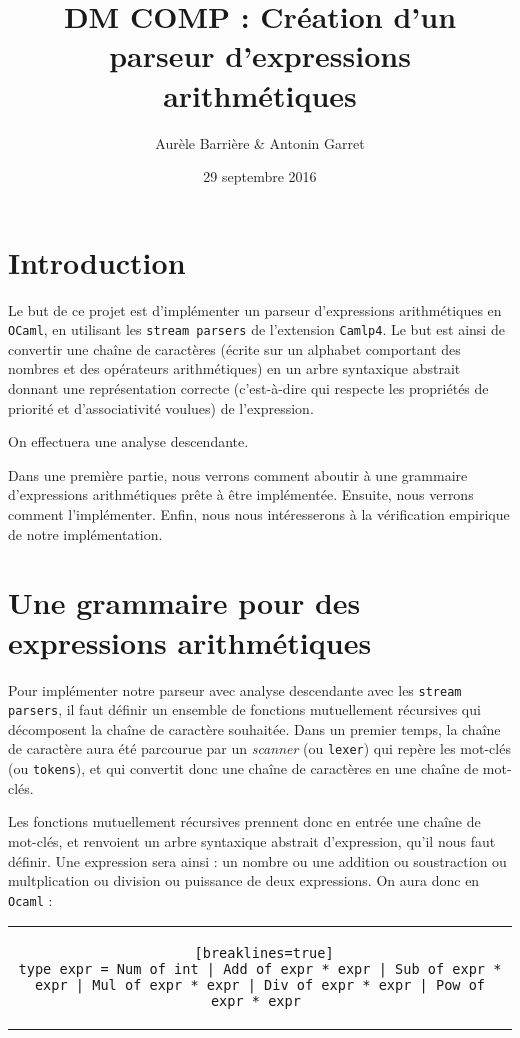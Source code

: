 \documentclass[11pt]{article}
\title{DM COMP : Création d'un parseur d'expressions arithmétiques}
\author{Aurèle Barrière \& Antonin Garret}
\date{29 septembre 2016}
\begin{document}
\maketitle

\section{Introduction}
Le but de ce projet est d'implémenter un parseur d'expressions arithmétiques en \texttt{OCaml}, en utilisant les \texttt{stream parsers} de l'extension \texttt{Camlp4}. Le but est ainsi de convertir une chaîne de caractères (écrite sur un alphabet comportant des nombres et des opérateurs arithmétiques) en un arbre syntaxique abstrait donnant une représentation correcte (c'est-à-dire qui respecte les propriétés de priorité et d'associativité voulues) de l'expression.

On effectuera une analyse descendante.


Dans une première partie, nous verrons comment aboutir à une grammaire d'expressions arithmétiques prête à être implémentée. Ensuite, nous verrons comment l'implémenter. Enfin, nous nous intéresserons à la vérification empirique de notre implémentation.

\section{Une grammaire pour des expressions arithmétiques}

Pour implémenter notre parseur avec analyse descendante avec les \texttt{stream parsers}, il faut définir un ensemble de fonctions mutuellement récursives qui décomposent la chaîne de caractère souhaitée. Dans un premier temps, la chaîne de caractère aura été parcourue par un \textit{scanner} (ou \texttt{lexer}) qui repère les mot-clés (ou \texttt{tokens}), et qui convertit donc une chaîne de caractères en une chaîne de mot-clés.

Les fonctions mutuellement récursives prennent donc en entrée une chaîne de mot-clés, et renvoient un arbre syntaxique abstrait d'expression, qu'il nous faut définir. Une expression sera ainsi : un nombre ou une addition ou soustraction ou multplication ou division ou puissance de deux expressions. On aura donc en \texttt{Ocaml} : 
\begin{center}
\begin{tabular}{c}
\begin{lstlisting} [breaklines=true]
type expr = Num of int | Add of expr * expr | Sub of expr * expr | Mul of expr * expr | Div of expr * expr | Pow of expr * expr 
\end{lstlisting}
\end{tabular}
\end{center}
\end{document}
